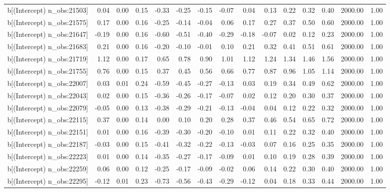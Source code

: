 \begin{table}[ht]
\begin{tabular}{rrrrrrrrrrrrrrr}
  b[(Intercept) n\_obs:21503] & 0.04 & 0.00 & 0.15 & -0.33 & -0.25 & -0.15 & -0.07 & 0.04 & 0.13 & 0.22 & 0.32 & 0.40 & 2000.00 & 1.00 \\ 
  b[(Intercept) n\_obs:21575] & 0.17 & 0.00 & 0.16 & -0.25 & -0.14 & -0.04 & 0.06 & 0.17 & 0.27 & 0.37 & 0.50 & 0.60 & 2000.00 & 1.00 \\ 
  b[(Intercept) n\_obs:21647] & -0.19 & 0.00 & 0.16 & -0.60 & -0.51 & -0.40 & -0.29 & -0.18 & -0.07 & 0.02 & 0.12 & 0.23 & 2000.00 & 1.00 \\ 
  b[(Intercept) n\_obs:21683] & 0.21 & 0.00 & 0.16 & -0.20 & -0.10 & -0.01 & 0.10 & 0.21 & 0.32 & 0.41 & 0.51 & 0.61 & 2000.00 & 1.00 \\ 
  b[(Intercept) n\_obs:21719] & 1.12 & 0.00 & 0.17 & 0.65 & 0.78 & 0.90 & 1.01 & 1.12 & 1.24 & 1.34 & 1.46 & 1.56 & 2000.00 & 1.00 \\ 
  b[(Intercept) n\_obs:21755] & 0.76 & 0.00 & 0.15 & 0.37 & 0.45 & 0.56 & 0.66 & 0.77 & 0.87 & 0.96 & 1.05 & 1.14 & 2000.00 & 1.00 \\ 
  b[(Intercept) n\_obs:22007] & 0.03 & 0.01 & 0.24 & -0.59 & -0.45 & -0.27 & -0.13 & 0.03 & 0.19 & 0.34 & 0.49 & 0.62 & 2000.00 & 1.00 \\ 
  b[(Intercept) n\_obs:22043] & 0.02 & 0.00 & 0.15 & -0.36 & -0.26 & -0.17 & -0.07 & 0.02 & 0.12 & 0.20 & 0.30 & 0.37 & 2000.00 & 1.00 \\ 
  b[(Intercept) n\_obs:22079] & -0.05 & 0.00 & 0.13 & -0.38 & -0.29 & -0.21 & -0.13 & -0.04 & 0.04 & 0.12 & 0.22 & 0.32 & 2000.00 & 1.00 \\ 
  b[(Intercept) n\_obs:22115] & 0.37 & 0.00 & 0.14 & 0.00 & 0.10 & 0.20 & 0.28 & 0.37 & 0.46 & 0.54 & 0.65 & 0.72 & 2000.00 & 1.00 \\ 
  b[(Intercept) n\_obs:22151] & 0.01 & 0.00 & 0.16 & -0.39 & -0.30 & -0.20 & -0.10 & 0.01 & 0.11 & 0.22 & 0.32 & 0.40 & 2000.00 & 1.00 \\ 
  b[(Intercept) n\_obs:22187] & -0.03 & 0.00 & 0.15 & -0.41 & -0.32 & -0.22 & -0.13 & -0.03 & 0.07 & 0.16 & 0.25 & 0.35 & 2000.00 & 1.00 \\ 
  b[(Intercept) n\_obs:22223] & 0.01 & 0.00 & 0.14 & -0.35 & -0.27 & -0.17 & -0.09 & 0.01 & 0.10 & 0.19 & 0.28 & 0.39 & 2000.00 & 1.00 \\ 
  b[(Intercept) n\_obs:22259] & 0.06 & 0.00 & 0.12 & -0.25 & -0.17 & -0.09 & -0.02 & 0.06 & 0.14 & 0.22 & 0.30 & 0.40 & 2000.00 & 1.00 \\ 
  b[(Intercept) n\_obs:22295] & -0.12 & 0.01 & 0.23 & -0.73 & -0.56 & -0.43 & -0.29 & -0.12 & 0.04 & 0.18 & 0.33 & 0.44 & 2000.00 & 1.00 \\ 

\end{tabular}
\end{table}
